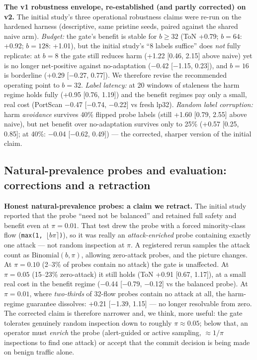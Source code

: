 \documentclass[a4paper,11pt]{article}
\makeatletter
\let\supp@subsection\subsection
\renewcommand{\subsection}{\FloatBarrier\supp@subsection}
\makeatother
\begin{document}
\textbf{The v1 robustness envelope, re-established (and partly corrected) on v2.} The initial study's three operational robustness claims were re-run on the hardened harness (descriptive, same pristine seeds, paired against the shared naive arm). \emph{Budget:} the gate's benefit is stable for $b \ge 32$ (ToN +0.79; $b{=}64$: +0.92; $b{=}128$: +1.01), but the initial study's ``8 labels suffice'' does \emph{not} fully replicate: at $b{=}8$ the gate still reduces harm (+1.22 [0.46, 2.15] above naive) yet is no longer net-positive against no-adaptation ($-$0.42 [$-$1.15, 0.23]), and $b{=}16$ is borderline (+0.29 [$-$0.27, 0.77]). We therefore revise the recommended operating point to $b{=}32$. \emph{Label latency:} at 20 windows of staleness the harm regime holds fully (+0.95 [0.76, 1.19]) and the benefit regimes pay only a small, real cost (PortScan $-$0.47 [$-$0.74, $-$0.22] vs fresh lp32). \emph{Random label corruption:} harm \emph{avoidance} survives 40\% flipped probe labels (still +1.60 [0.79, 2.55] above naive), but net benefit over no-adaptation survives only to 25\% (+0.57 [0.25, 0.85]; at 40\%: $-$0.04 [$-$0.62, 0.49]) --- the corrected, sharper version of the initial claim.

\subsection{Natural-prevalence probes and evaluation: corrections and a retraction}

\textbf{Honest natural-prevalence probes: a claim we retract.} The initial study reported that the probe ``need not be balanced'' and retained full safety and benefit even at $\pi{=}0.01$. That test drew the probe with a forced minority-class flow (\texttt{max(1,\,$\lfloor b\pi \rceil$)}), so it was really an \emph{attack-enriched} probe containing exactly one attack --- not random inspection at $\pi$. A registered rerun samples the attack count as $\mathrm{Binomial}(b, \pi)$, allowing zero-attack probes, and the picture changes. At $\pi{=}0.10$ (2--3\% of probes contain no attack) the gate is unaffected. At $\pi{=}0.05$ (15--23\% zero-attack) it still holds (ToN +0.91 [0.67, 1.17]), at a small real cost in the benefit regime ($-$0.44 [$-$0.79, $-$0.12] vs the balanced probe). At $\pi{=}0.01$, where \emph{two-thirds} of 32-flow probes contain no attack at all, the harm-regime guarantee dissolves: +0.21 [$-$1.39, 1.15] --- no longer resolvable from zero. The corrected claim is therefore narrower and, we think, more useful: the gate tolerates genuinely random inspection down to roughly $\pi \approx 0.05$; below that, an operator must \emph{enrich} the probe (alert-guided or active sampling, $\approx 1/\pi$ inspections to find one attack) or accept that the commit decision is being made on benign traffic alone.
\end{document}
